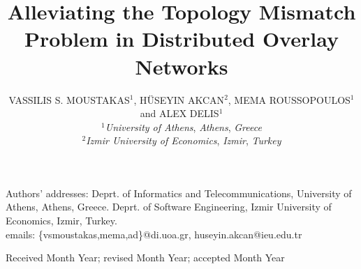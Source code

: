 \documentclass[acmcsur,acmnow]{acmtrans2m}
\title{Alleviating the Topology Mismatch Problem in Distributed Overlay Networks}
\author{
VASSILIS S. MOUSTAKAS$^1$, H\"USEYIN AKCAN$^2$, MEMA ROUSSOPOULOS$^1$ and ALEX
DELIS$^1$\\
$^1$\emph{University of Athens}, \emph{Athens}, \emph{Greece}\\
$^2$\emph{Izmir University of Economics}, \emph{Izmir}, \emph{Turkey}
}
\begin{document}
\begin{bottomstuff}
Authors' addresses: Deprt. of Informatics and Telecommunications,
University of Athens, Athens, Greece. Deprt. of Software
Engineering, Izmir University of Economics, Izmir, Turkey.\\
emails: \{vsmoustakas,mema,ad\}@di.uoa.gr, huseyin.akcan@ieu.edu.tr
\end{bottomstuff}

\maketitle








%
%
%
%







\begin{received}
Received Month Year;
revised Month Year; accepted Month Year
\end{received}
\end{document}
